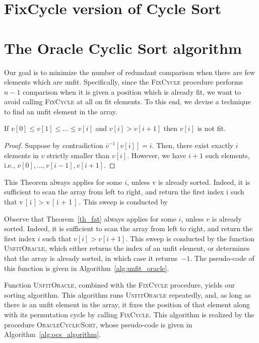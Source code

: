 
\section{FixCycle version of Cycle Sort}




\section{The Oracle Cyclic Sort algorithm}

Our goal is to minimize the number of redundant comparison when there are few elements which are unfit.
Specifically, since the \textsc{FixCycle} procedure performs $n-1$ comparison
when it is given a position which is already fit,
we want to avoid calling \textsc{FixCycle} at all on fit elements.
To this end, we devise a technique to find an unfit element in the array.

\begin{thm}
\label{th_fat}
If $v[0] \le v[1] \le ... \le v[i]$ and $v[i] > v[i+1]$ then $v[i]$ is not fit.
\begin{proof}
Suppose by contradiction $\overline{v}^{-1}[v[i]] = i$.
Then, there exist exactly $i$ elements in $v$ strictly smaller than $v[i]$.
However, we have $i+1$ such elements, i.e., $v[0],\dots,v[i-1],v[i+1]$.
\end{proof}
\end{thm}

This Theorem always
applies for some $i$, unless v is already sorted. Indeed,
it is sufficient to scan the array from left
to right, and return the first index i such
that v [ i ] > v [ i + 1 ] . This sweep is conducted by

Observe that Theorem~\ref{th_fat} always applies for some $i$, unless $v$ is already sorted.
Indeed, it is sufficient to scan the array from left to right,
and return the first index $i$ such that $v[i] > v[i+1]$.
This sweep is conducted by the function \textsc{UnfitOracle},
which either returns the index of an unfit element,
or determines that the array is already sorted,
in which case it returns~$-1$.
The pseudo-code of this function is given in Algorithm~\ref{alg:unfit_oracle}.



Function \textsc{UnfitOracle}, combined with the \textsc{FixCycle} procedure, yields our sorting algorithm.
This algorithm runs \textsc{UnfitOracle} repeatedly, and,
as long as there is an unfit element in the array,
it fixes the position of that element along with its permutation cycle
by calling \textsc{FixCycle}.
This algorithm is realized by the procedure \textsc{OracleCyclicSort},
whose pseudo-code is given in Algorithm~\ref{alg:ocs_algorithm}.



